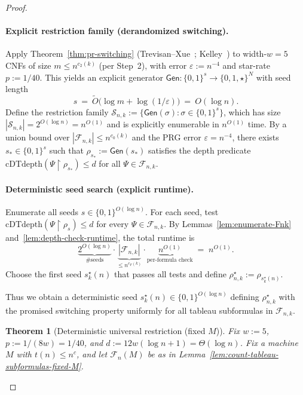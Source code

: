 \documentclass[12pt]{article}
\newtheorem{theorem}{Theorem}
\theoremstyle{definition}
\theoremstyle{definition}
\theoremstyle{remark}
\theoremstyle{remark}
\begin{document}
\begin{proof}
\paragraph{Explicit restriction family (derandomized switching).}
Apply Theorem~\ref{thm:pr-switching} (Trevisan--Xue~\cite{TrevisanXueCCC2013}; Kelley~\cite{KelleySwitchingECCC2020}) to width-$w=5$ CNFs of size $m\le n^{c_2(k)}$ (per Step~2), with error $\varepsilon := n^{-4}$ and star-rate $p:=1/40$.
This yields an explicit generator $\mathsf{Gen}:\{0,1\}^{s}\to\{0,1,\star\}^N$ with seed length
\[
s\ =\ \tilde{O}\bigl(\log m + \log(1/\varepsilon)\bigr)\ =\ O(\log n).
\]
Define the restriction family $\mathcal{S}_{n,k}:=\{\mathsf{Gen}(\sigma):\sigma\in\{0,1\}^s\}$, which has size $|\mathcal{S}_{n,k}|=2^{O(\log n)}=n^{O(1)}$ and is explicitly enumerable in $n^{O(1)}$ time.
By a union bound over $|\mathcal{F}_{n,k}|\le n^{c_0(k)}$ and the PRG error $\varepsilon= n^{-4}$, there exists $s_*\in\{0,1\}^s$ such that $\rho_{s_*}:=\mathsf{Gen}(s_*)$ satisfies the depth predicate $\mathrm{cDTdepth}(\Psi\upharpoonright\rho_{s_*})\le d$ for all $\Psi\in\mathcal{F}_{n,k}$.

\paragraph{Deterministic seed search (explicit runtime).}
Enumerate all seeds $s\in\{0,1\}^{O(\log n)}$.
For each seed, test $\mathrm{cDTdepth}(\Psi\!\upharpoonright\!\rho_s)\le d$ for every $\Psi\in\mathcal{F}_{n,k}$.
By Lemmas~\ref{lem:enumerate-Fnk} and~\ref{lem:depth-check-runtime}, the total runtime is
\[
\underbrace{2^{O(\log n)}}_{\text{\#seeds}}\cdot \underbrace{|\mathcal{F}_{n,k}|}_{\le n^{c_F(k)}}\cdot \underbrace{n^{O(1)}}_{\text{per-formula check}} \;=\; n^{O(1)}.
\]
Choose the first seed $s^\star_k(n)$ that passes all tests and define $\rho^\star_{n,k}:=\rho_{s^\star_k(n)}$.

Thus we obtain a deterministic seed $s^\star_k(n)\in\{0,1\}^{O(\log n)}$ defining $\rho^\star_{n,k}$ with the promised switching property uniformly for all tableau subformulas in $\mathcal{F}_{n,k}$.

\begin{theorem}[Deterministic universal restriction (fixed $M$)]
\label{thm:det-universal-restriction-fixed-M}
Fix $w:=5$, $p:=1/(8w)=1/40$, and $d:=12w(\log n+1)=\Theta(\log n)$.
Fix a machine $M$ with $t(n)\le n^c$, and let $\mathcal{F}_n(M)$ be as in
Lemma~\ref{lem:count-tableau-subformulas-fixed-M}.


\end{theorem}
\end{proof}
\end{document}

